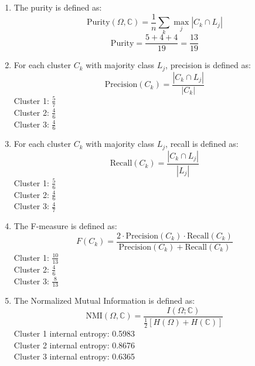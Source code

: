 \documentclass[12pt]{article}
\begin{document}
\begin{enumerate}[label=(\alph*)]

    \item

    The purity is defined as:
    \[
        \text{Purity}(\Omega, \mathbb{C}) = \frac{1}{n} \sum_{k} \max_{j} |C_k \cap L_j|
    \]
    \[
        \text{Purity} = \frac{5 + 4 + 4}{19}= \frac{13}{19}
    \]

    \vspace{2em}

    \item 

    For each cluster $C_k$ with majority class $L_j$, precision is defined as:
    \[
        \text{Precision}(C_k) = \frac{|C_k \cap L_j|}{|C_k|}
    \]
    Cluster 1: $\frac{5}{7}$ \\
    Cluster 2: $\frac{4}{6}$ \\
    Cluster 3: $\frac{4}{6}$

    \vspace{2em}

    \item

    For each cluster $C_k$ with majority class $L_j$, recall is defined as:
    \[
        \text{Recall}(C_k) = \frac{|C_k \cap L_j|}{|L_j|}
    \]
    Cluster 1: $\frac{5}{6}$ \\
    Cluster 2: $\frac{4}{6}$ \\
    Cluster 3: $\frac{4}{7}$

    \vspace{2em}

    \item

    The F-measure is defined as:
    \[
        F(C_k) = \frac{2 \cdot \text{Precision}(C_k) \cdot \text{Recall}(C_k)}{\text{Precision}(C_k) + \text{Recall}(C_k)}
    \]
    Cluster 1: $\frac{10}{13}$ \\
    Cluster 2: $\frac{4}{6}$ \\
    Cluster 3: $\frac{8}{13}$

    \newpage
    \item

    The Normalized Mutual Information is defined as:
    \[
        \text{NMI}(\Omega, \mathbb{C}) = \frac{I(\Omega; \mathbb{C})}{\frac{1}{2}[H(\Omega) + H(\mathbb{C})]}
    \]
    Cluster 1 internal entropy: 0.5983 \\
    Cluster 2 internal entropy: 0.8676 \\
    Cluster 3 internal entropy: 0.6365 \\


\end{enumerate}
\end{document}
